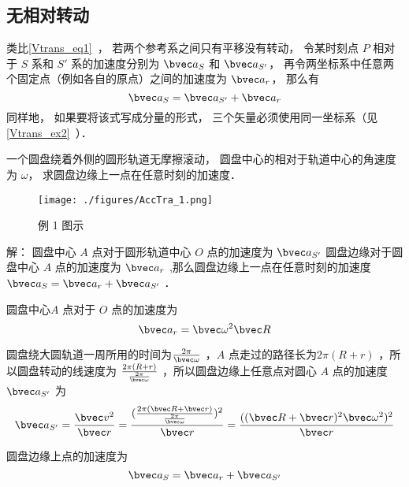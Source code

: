 

\subsection{无相对转动}
类比\autoref{Vtrans_eq1}~， 若两个参考系之间只有平移没有转动， 令某时刻点 $P$ 相对于 $S$ 系和 $S'$ 系的加速度分别为 $\bvec a_S$ 和 $\bvec a_{S'}$， 再令两坐标系中任意两个固定点（例如各自的原点）之间的加速度为 $\bvec a_r$， 那么有
\begin{equation}\label{AccTra_eq1}
\bvec a_S = \bvec a_{S'} + \bvec a_r
\end{equation}
同样地， 如果要将该式写成分量的形式， 三个矢量必须使用同一坐标系（见\autoref{Vtrans_ex2}~）．

\begin{example}{}
一个圆盘绕着外侧的圆形轨道无摩擦滚动， 圆盘中心的相对于轨道中心的角速度为 $\omega$， 求圆盘边缘上一点在任意时刻的加速度．
\begin{figure}[ht]
\centering
\texttt{[image: ./figures/AccTra\_1.png]}
\caption{例 1 图示} \label{AccTra_fig1}
\end{figure}

解： 圆盘中心 $A$ 点对于圆形轨道中心 $O$ 点的加速度为 $\bvec a_{S'}$ 圆盘边缘对于圆盘中心 $A$ 点的加速度为 $\bvec a_r$ ,那么圆盘边缘上一点在任意时刻的加速度 $\bvec a_S = \bvec a_r + \bvec a_{S'}$ ．

圆盘中心$A$ 点对于 $O$ 点的加速度为
\begin{equation}
\bvec a_{r} = \bvec \omega^{2} \bvec R
\end{equation}

圆盘绕大圆轨道一周所用的时间为$\frac{2 \pi}{\bvec \omega}$ ，$A$ 点走过的路径长为$2 \pi (R+r)$ ，所以圆盘转动的线速度为 $\frac{2 \pi (R+r)}{\frac{2 \pi}{\bvec \omega}}$ ，所以圆盘边缘上任意点对圆心 $A$ 点的加速度 $\bvec a_{S'}$ 为
\begin{equation}
\bvec a_{S'} = \frac{\bvec v^2}{\bvec r}= \frac{(\frac{2 \pi (\bvec R+\bvec r)}{\frac{2 \pi}{\bvec \omega}})^2}{\bvec r} = \frac{((\bvec R + \bvec r)^2 \bvec \omega^2 )^2}{\bvec r}
\end{equation}

圆盘边缘上点的加速度为
\begin{equation}
\bvec a_S = \bvec a_r + \bvec a_{S'} 
\end{equation}

\end{example}

